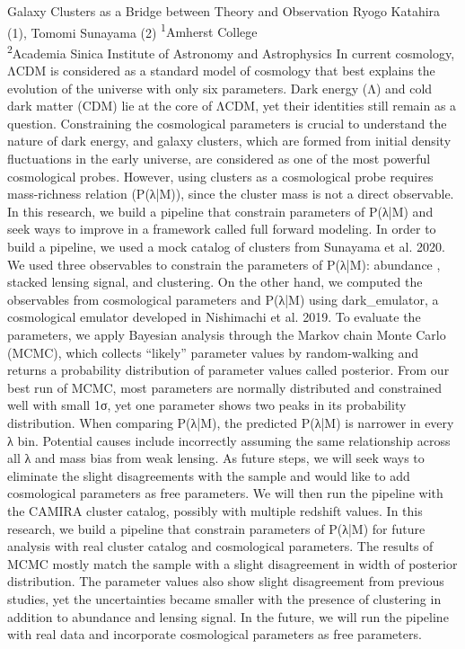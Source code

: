 \makeabstract
{
Galaxy Clusters as a Bridge between Theory and Observation
}
{
Ryogo Katahira (1), Tomomi Sunayama (2)
}
{
\textsuperscript{1}Amherst College\\
\textsuperscript{2}Academia Sinica Institute of Astronomy and Astrophysics
}
{
In current cosmology, ΛCDM is considered as a standard model of cosmology that best explains the evolution of the universe with only six parameters. Dark energy (Λ) and cold dark matter (CDM) lie at the core of ΛCDM, yet their identities still remain as a question. Constraining the cosmological parameters is crucial to understand the nature of dark energy, and galaxy clusters, which are formed from initial density fluctuations in the early universe, are considered as  one of the most powerful cosmological probes. However, using clusters as a cosmological probe requires mass-richness relation (P(λ|M)), since the cluster mass is not a direct observable. In this research, we build a pipeline that constrain parameters of P(λ|M) and seek ways to improve in a framework called full forward modeling.
}
{
In order to build a pipeline, we used a mock catalog of clusters from Sunayama et al. 2020. We used three observables to constrain the parameters of P(λ|M): abundance , stacked lensing signal, and clustering. On the other hand, we computed the observables from cosmological parameters and P(λ|M) using dark\_emulator, a cosmological emulator developed in Nishimachi et al. 2019. To evaluate the parameters, we apply Bayesian analysis through the Markov chain Monte Carlo (MCMC), which collects “likely” parameter values by random-walking and returns a probability distribution of parameter values called posterior.
}
{
From our best run of MCMC, most parameters are normally distributed and constrained well with small 1σ, yet one parameter shows two peaks in its probability distribution.
When comparing P(λ|M), the predicted P(λ|M) is narrower in every λ bin. Potential causes include incorrectly assuming the same relationship across all λ and mass bias from weak lensing.
As future steps, we will seek ways to eliminate the slight disagreements with the sample and would like to add cosmological parameters as free parameters. We will then run the pipeline with the CAMIRA cluster catalog, possibly with multiple redshift values.
}
{
In this research, we build a pipeline that constrain parameters of P(λ|M) for future analysis with real cluster catalog and cosmological parameters. The results of MCMC mostly match the sample with a slight disagreement in width of posterior distribution. The parameter values also show slight disagreement from previous studies, yet the uncertainties became smaller with the presence of clustering in addition to abundance and lensing signal. In the future, we will run the pipeline with real data and incorporate cosmological parameters as free parameters.
}

\newpage
